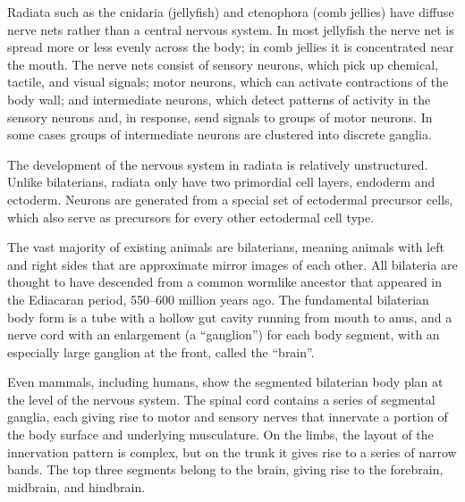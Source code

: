 \documentclass[]{book}
\begin{document}
Radiata such as the cnidaria (jellyfish) and ctenophora (comb jellies) have diffuse nerve nets rather than a central nervous system. In most jellyfish the nerve net is spread more or less evenly across the body; in comb jellies it is concentrated near the mouth. The nerve nets consist of sensory neurons, which pick up chemical, tactile, and visual signals; motor neurons, which can activate contractions of the body wall; and intermediate neurons, which detect patterns of activity in the sensory neurons and, in response, send signals to groups of motor neurons. In some cases groups of intermediate neurons are clustered into discrete ganglia.

The development of the nervous system in radiata is relatively unstructured. Unlike bilaterians, radiata only have two primordial cell layers, endoderm and ectoderm. Neurons are generated from a special set of ectodermal precursor cells, which also serve as precursors for every other ectodermal cell type.

The vast majority of existing animals are bilaterians, meaning animals with left and right sides that are approximate mirror images of each other. All bilateria are thought to have descended from a common wormlike ancestor that appeared in the Ediacaran period, 550--600 million years ago. The fundamental bilaterian body form is a tube with a hollow gut cavity running from mouth to anus, and a nerve cord with an enlargement (a ``ganglion'') for each body segment, with an especially large ganglion at the front, called the ``brain''.

Even mammals, including humans, show the segmented bilaterian body plan at the level of the nervous system. The spinal cord contains a series of segmental ganglia, each giving rise to motor and sensory nerves that innervate a portion of the body surface and underlying musculature. On the limbs, the layout of the innervation pattern is complex, but on the trunk it gives rise to a series of narrow bands. The top three segments belong to the brain, giving rise to the forebrain, midbrain, and hindbrain.
\end{document}
